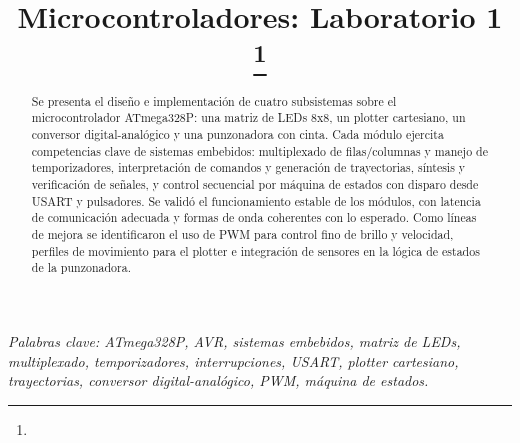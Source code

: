 \documentclass[conference]{IEEEtran}
\begin{document}
\title{Microcontroladores: Laboratorio 1\\
{\footnotesize \textsuperscript{}
}
\thanks{}
}

\author{
\and
{}
\and
{}
}
\maketitle


\begin{abstract}
Se presenta el diseño e implementación de cuatro subsistemas sobre el microcontrolador ATmega328P: una matriz de LEDs 8x8, un plotter cartesiano, un conversor digital-analógico y una punzonadora con cinta. Cada módulo ejercita competencias clave de sistemas embebidos: multiplexado de filas/columnas y manejo de temporizadores, interpretación de comandos y generación de trayectorias, síntesis y verificación de señales, y control secuencial por máquina de estados con disparo desde USART y pulsadores. 
Se validó el funcionamiento estable de los módulos, con latencia de comunicación adecuada y formas de onda coherentes con lo esperado. Como líneas de mejora se identificaron el uso de PWM para control fino de brillo y velocidad, perfiles de movimiento para el plotter e integración de sensores en la lógica de estados de la punzonadora.
\end{abstract}

\textit{Palabras clave: ATmega328P, AVR, sistemas embebidos, matriz de LEDs, multiplexado, temporizadores, interrupciones, USART, plotter cartesiano, trayectorias, conversor digital-analógico, PWM, máquina de estados.}










            

\nocite{*}



\end{document}
